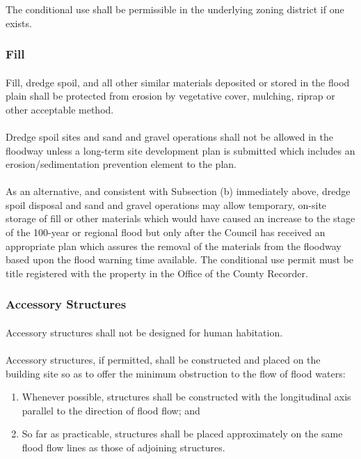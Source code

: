 \subsubsection{}
The conditional use shall be permissible in the underlying zoning district if one exists.
\subsubsection{Fill}
\paragraph{}
Fill, dredge spoil, and all other similar materials deposited or stored in the flood plain shall be protected from erosion by vegetative cover, mulching, riprap or other acceptable method.
\paragraph{}
Dredge spoil sites and sand and gravel operations shall not be allowed in the floodway unless a long-term site development plan is submitted which includes an erosion/sedimentation prevention element to the plan.
\paragraph{}
As an alternative, and consistent with Subsection (b) immediately above, dredge spoil disposal and sand and gravel operations may allow temporary, on-site storage of fill or other materials which would have caused an increase to the stage of the 100-year or regional flood but only after the Council has received an appropriate plan which assures the removal of the materials from the floodway based upon the flood warning time available. The conditional use permit must be title registered with the property in the Office of the County Recorder.
\subsubsection{Accessory Structures}
\paragraph{}
Accessory structures shall not be designed for human habitation.
\paragraph{}
Accessory structures, if permitted, shall be constructed and placed on the building site so as to offer the minimum obstruction to the flow of flood waters:
\begin{enumerate}[{\indent}1)]
    \item Whenever possible, structures shall be constructed with the longitudinal axis parallel to the direction of flood flow; and
    \item So far as practicable, structures shall be placed approximately on the same flood flow lines as those of adjoining structures.
\end{enumerate}
